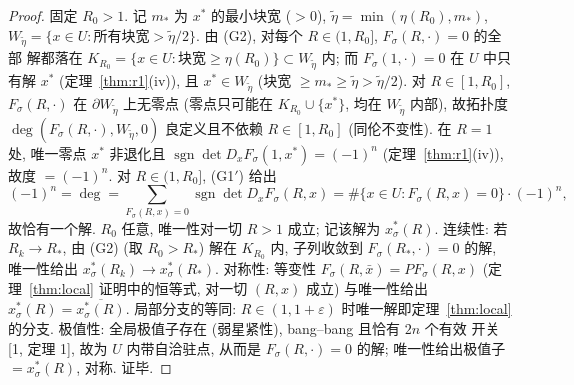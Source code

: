 \documentclass[UTF8]{ctexart}
\begin{document}
\begin{proof}
固定 $R_0>1$. 记 $m_*$ 为 $x^*$ 的最小块宽 ($>0$),
$\tilde\eta=\min(\eta(R_0),m_*)$, $W_{\tilde\eta}=\{x\in U: \text{所有块宽}
>\tilde\eta/2\}$. 由 (G2), 对每个 $R\in(1,R_0]$, $F_\sigma(R,\cdot)=0$ 的全部
解都落在 $K_{R_0}=\{x\in U: \text{块宽}\ge\eta(R_0)\}\subset W_{\tilde\eta}$ 内;
而 $F_\sigma(1,\cdot)=0$ 在 $U$ 中只有解 $x^*$ (定理~\ref{thm:r1}(iv)), 且
$x^*\in W_{\tilde\eta}$ (块宽 $\ge m_*\ge\tilde\eta>\tilde\eta/2$). 对
$R\in[1,R_0]$, $F_\sigma(R,\cdot)$ 在 $\partial W_{\tilde\eta}$ 上无零点
(零点只可能在 $K_{R_0}\cup\{x^*\}$, 均在 $W_{\tilde\eta}$ 内部), 故拓扑度
$\deg(F_\sigma(R,\cdot),W_{\tilde\eta},0)$ 良定义且不依赖 $R\in[1,R_0]$
(同伦不变性). 在 $R=1$ 处, 唯一零点 $x^*$ 非退化且
$\operatorname{sgn}\det D_xF_\sigma(1,x^*)=(-1)^n$
(定理~\ref{thm:r1}(iv)), 故度 $=(-1)^n$. 对 $R\in(1,R_0]$, (G1$'$) 给出
\begin{equation*}
	(-1)^n=\deg
	=\sum_{F_\sigma(R,x)=0}\operatorname{sgn}\det D_xF_\sigma(R,x)
	=\#\{x\in U: F_\sigma(R,x)=0\}\cdot(-1)^n,
\end{equation*}
故恰有一个解. $R_0$ 任意, 唯一性对一切 $R>1$ 成立; 记该解为
$x_\sigma^*(R)$. 连续性: 若 $R_k\to R_*$, 由 (G2) (取 $R_0>R_*$) 解在
$K_{R_0}$ 内, 子列收敛到 $F_\sigma(R_*,\cdot)=0$ 的解, 唯一性给出
$x_\sigma^*(R_k)\to x_\sigma^*(R_*)$. 对称性: 等变性
$F_\sigma(R,\bar x)=PF_\sigma(R,x)$ (定理~\ref{thm:local} 证明中的恒等式,
对一切 $(R,x)$ 成立) 与唯一性给出 $x_\sigma^*(R)=\overline{x_\sigma^*(R)}$.
局部分支的等同: $R\in(1,1+\varepsilon)$ 时唯一解即定理~\ref{thm:local}
的分支. 极值性: 全局极值子存在 (弱星紧性), bang--bang 且恰有 $2n$ 个有效
开关 [1, 定理 1], 故为 $U$ 内带自洽驻点, 从而是 $F_\sigma(R,\cdot)=0$ 的解;
唯一性给出极值子 $=x_\sigma^*(R)$, 对称. 证毕.
\end{proof}
\end{document}
